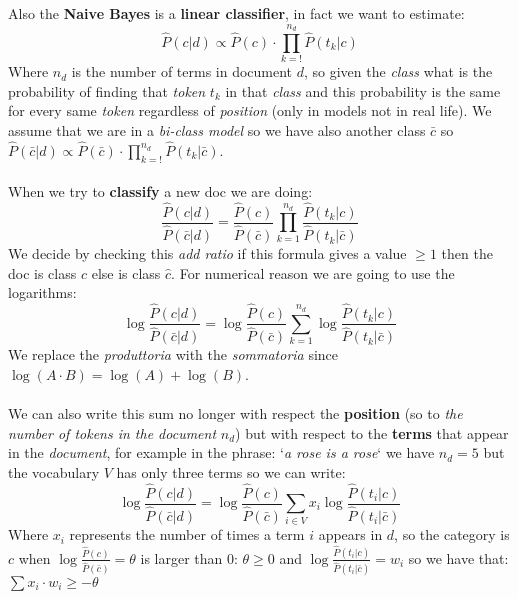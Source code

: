 \documentclass{article}
\begin{document}
Also the \textbf{Naive Bayes} is a \textbf{linear classifier}, in fact we want to estimate:
\[\hat{P}(c|d) \propto \hat{P}(c) \cdot \prod_{k=!}^{n_d} \hat{P}(t_k|c)\]
Where $n_d$ is the number of terms in document $d$, so given the \emph{class} what is the probability of finding that \emph{token} $t_k$ in that \emph{class} and this probability is the same for every same \emph{token} regardless of \emph{position} (only in models not in real life). We assume that we are in a \emph{bi-class model }so we have also another class $\bar{c}$ so  $\hat{P}(\bar{c}|d) \propto \hat{P}(\bar{c}) \cdot \prod_{k=!}^{n_d} \hat{P}(t_k|\bar{c})$.\\\\
When we try to \textbf{classify} a new doc we are doing: \[\frac{\hat{P}(c|d) }{\hat{P}(\bar{c}|d) } = \frac{\hat{P}(c)}{\hat{P}(\bar{c})} \prod_{k=1}^{n_d} \frac{ \hat{P}(t_k|c)}{\hat{P}(t_k|\bar{c})}\]
We decide by checking this \emph{add ratio} if this formula gives a value $\geq 1$ then the doc is class $c$ else is class $\hat{c}$. For numerical reason we are going to use the logarithms:
\[\log \frac{\hat{P}(c|d) }{\hat{P}(\bar{c}|d) } = \log \frac{\hat{P}(c)}{\hat{P}(\bar{c})} \sum_{k=1}^{n_d} \log \frac{ \hat{P}(t_k|c)}{\hat{P}(t_k|\bar{c})}\]
We replace the \emph{produttoria} with the \emph{sommatoria} since $\log(A \cdot B) = \log(A) + \log(B) $. \\\\
We can also write this sum no longer with respect the \textbf{position} (so to \emph{the number of tokens in the document} $n_d$) but with respect to the \textbf{terms} that appear in the \emph{document}, for example in the phrase: `\emph{a rose is a rose}` we have $n_d = 5$ but the vocabulary $V$ has only three terms so we can write:
 \[\log \frac{\hat{P}(c|d) }{\hat{P}(\bar{c}|d) } = \log \frac{\hat{P}(c)}{\hat{P}(\bar{c})} \sum_{i \in V} x_i \log \frac{\hat{P}(t_i|c)}{\hat{P}(t_i|\bar{c})}\]
Where $x_i$ represents the number of times a term $i$ appears in $d$, so the category is $c$ when $\log \frac{\hat{P}(c)}{\hat{P}(\bar{c})} = \theta$ is larger than 0: $\theta \geq 0$ and $\log \frac{\hat{P}(t_i|c)}{\hat{P}(t_i|\bar{c})} = w_i$ so we have that: $\sum x_i \cdot w_i \geq - \theta$
\end{document}
